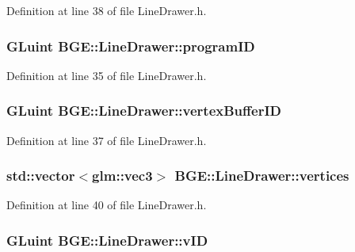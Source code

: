 Definition at line 38 of file Line\-Drawer.\-h.

\hypertarget{class_b_g_e_1_1_line_drawer_ae289a06507a5eb1d5a70f16ca2948dc1}{
\subsubsection[{program\-I\-D}]{\setlength{\rightskip}{0pt plus 5cm}G\-Luint B\-G\-E\-::\-Line\-Drawer\-::program\-I\-D}}\label{class_b_g_e_1_1_line_drawer_ae289a06507a5eb1d5a70f16ca2948dc1}


Definition at line 35 of file Line\-Drawer.\-h.

\hypertarget{class_b_g_e_1_1_line_drawer_a0fd71427171ad80175ab38353327d425}{
\subsubsection[{vertex\-Buffer\-I\-D}]{\setlength{\rightskip}{0pt plus 5cm}G\-Luint B\-G\-E\-::\-Line\-Drawer\-::vertex\-Buffer\-I\-D}}\label{class_b_g_e_1_1_line_drawer_a0fd71427171ad80175ab38353327d425}


Definition at line 37 of file Line\-Drawer.\-h.

\hypertarget{class_b_g_e_1_1_line_drawer_a83f412c313dd0514762d1ef0d55ca7a7}{
\subsubsection[{vertices}]{\setlength{\rightskip}{0pt plus 5cm}std\-::vector$<$glm\-::vec3$>$ B\-G\-E\-::\-Line\-Drawer\-::vertices}}\label{class_b_g_e_1_1_line_drawer_a83f412c313dd0514762d1ef0d55ca7a7}


Definition at line 40 of file Line\-Drawer.\-h.

\hypertarget{class_b_g_e_1_1_line_drawer_ae18757246fe4eca042c2942f59dd153e}{
\subsubsection[{v\-I\-D}]{\setlength{\rightskip}{0pt plus 5cm}G\-Luint B\-G\-E\-::\-Line\-Drawer\-::v\-I\-D}}\label{class_b_g_e_1_1_line_drawer_ae18757246fe4eca042c2942f59dd153e}


